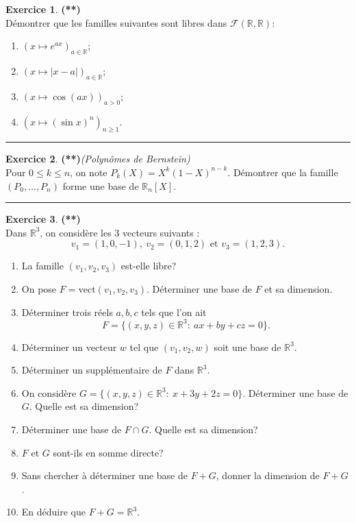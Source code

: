 \documentclass[a4paper,11pt]{article}
\theoremstyle{definition}
\newtheorem{exo}{Exercice} %
\begin{document}
\begin{minipage}{1\linewidth}\begin{minipage}[t]{0.48\linewidth}\raggedright
		
		
		\begin{exo}\textbf{(**)}\quad\\[0.2cm]
			Démontrer que les familles suivantes sont libres dans $\mathcal F(\mathbb R,\mathbb R)$:
			\begin{enumerate}
				\item $(x\mapsto e^{ax})_{a\in\mathbb R}$;
				\item $(x\mapsto |x-a|)_{a\in\mathbb R}$;
				\item $(x\mapsto \cos(ax))_{a>0}$;
				\item $(x\mapsto (\sin x)^n)_{n\geq 1}$.
			\end{enumerate}
			
			\centering\rule{1\linewidth}{0.6pt}\end{exo}
		
		
		\begin{exo}\textbf{(**)}\quad\textit{(Polynômes de Bernstein)}\\[0.2cm]
		Pour $0\leq k\leq n$, on note $P_k(X)=X^k(1-X)^{n-k}$. Démontrer que la famille $(P_0,\dots,P_n)$ forme une base de $\mathbb R_n[X]$.
			
		\centering\rule{1\linewidth}{0.6pt}\end{exo}
	
		
		\begin{exo}\textbf{(**)}\quad\\[0.2cm]
		Dans $\mathbb R^3$, on considère les 3 vecteurs suivants : 
		$$v_1=(1,0,-1),\ v_2=(0,1,2)\textrm{ et }v_3=(1,2,3).$$
		\begin{enumerate}
			\item La famille $(v_1,v_2,v_3)$ est-elle libre?
			\item On pose $F=\textrm{vect}(v_1,v_2,v_3)$. Déterminer une base de $F$ et sa dimension. 
			\item Déterminer trois réels $a,b,c$ tels que l'on ait 
			$$F=\{(x,y,z)\in\mathbb R^3:\ ax+by+cz=0\}.$$
			\item Déterminer un vecteur $w$ tel que $(v_1,v_2,w)$ soit une base de $\mathbb R^3$.
			\item Déterminer un supplémentaire de $F$ dans $\mathbb R^3$.
			\item On considère $G=\{(x,y,z)\in\mathbb R^3:\ x+3y+2z=0\}$. Déterminer une base de $G$. Quelle est sa dimension?
			\item Déterminer une base de $F\cap G$. Quelle est sa dimension?
			\item $F$ et $G$ sont-ils en somme directe?
			\item Sans chercher à déterminer une base de $F+G$, donner la dimension de $F+G$.
			\item En déduire que $F+G=\mathbb R^3$.
		\end{enumerate}
			

\end{exo}
\end{minipage}
\end{minipage}
\end{document}
